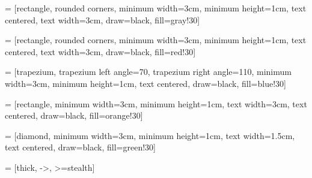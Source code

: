 \newcommand{\figref}[1]{\textbf{\hyperref[#1]{Figure \ref{#1}}}}
\newcommand{\tableref}[1]{\textbf{\hyperref[#1]{Table \ref{#1}}}}
\renewcommand{\eqref}[1]{\hyperref[#1]{Eq.\hspace{.25em}(\ref{#1})}}

\newcommand{\reducedstrut}{\vrule width 0pt height .9\ht\strutbox depth .9\dp\strutbox\relax}
\newcommand{\code}[1]{%
  \setlength{\fboxsep}{0pt}%
  \colorbox{gray!20}{\reducedstrut\texttt{#1}\/}
  \hspace{-0.5em}
}

\newcommand{\warn}[1]{
\begin{center}
\emph{Warning: #1}
\end{center}
}

\setcounter{tocdepth}{2}

\def\2{\textsubscript{2}}
\def\cm{cm\textsubscript{-1}}

\def\flowwidth{3cm}

 = [rectangle,
rounded corners,
minimum width=\flowwidth,
minimum height=1cm,
text centered,
text width=\flowwidth,
draw=black,
fill=gray!30]

 = [rectangle,
rounded corners,
minimum width=\flowwidth,
minimum height=1cm,
text centered,
text width=\flowwidth,
draw=black,
fill=red!30]

 = [trapezium,
trapezium left angle=70,
trapezium right angle=110,
minimum width=\flowwidth,
minimum height=1cm,
text centered,
draw=black,
fill=blue!30]

 = [rectangle,
minimum width=\flowwidth,
minimum height=1cm,
text width=\flowwidth,
text centered,
draw=black,
fill=orange!30]

 = [diamond,
minimum width=\flowwidth,
minimum height=1cm,
text width=1.5cm,
text centered,
draw=black,
fill=green!30]

 = [thick, ->, >=stealth]
